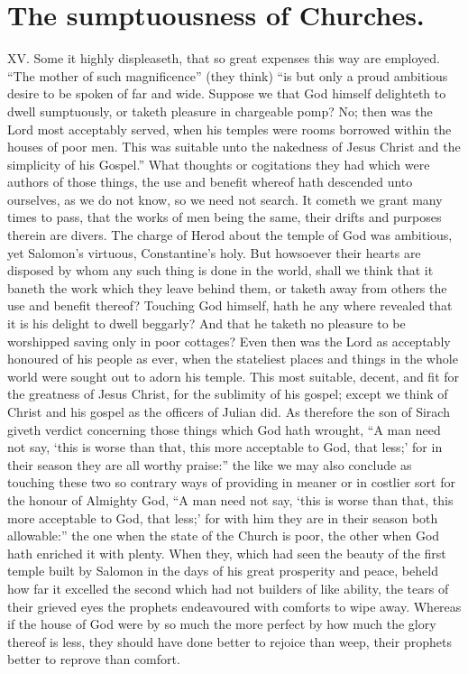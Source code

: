 \section*{The sumptuousness of Churches.}
XV. Some it highly displeaseth, that so great expenses this way are employed. “The mother of such magnificence” (they think) “is but only a proud ambitious desire to be spoken of far and wide. Suppose we that God himself delighteth to dwell sumptuously, or taketh pleasure in  chargeable pomp? No; then was the Lord most acceptably served, when his temples were rooms borrowed within the houses of poor men. This was suitable unto the nakedness of Jesus Christ and the simplicity of his Gospel.”
What thoughts or cogitations they had which were authors of those things, the use and benefit whereof hath descended unto ourselves, as we do not know, so we need not search. It cometh we grant many times to pass, that the works of men being the same, their drifts and purposes therein are divers. The charge of Herod about the temple of God was ambitious, yet Salomon’s virtuous, Constantine’s holy. But howsoever their hearts are disposed by whom any such thing is done in the world, shall we think that it baneth the work which they leave behind them, or taketh away from others the use and benefit thereof?
Touching God himself, hath he any where revealed that it is his delight to dwell beggarly? And that he taketh no pleasure to be worshipped saving only in poor cottages? Even then was the Lord as acceptably honoured of his people as ever, when the stateliest places and things in the whole world were sought out to adorn his temple. This most suitable, decent, and fit for the greatness of Jesus Christ, for the sublimity of his gospel; except we think of Christ and his gospel as the officers of Julian did. As therefore the son of Sirach giveth verdict concerning those things which God hath wrought, “A man need not say, ‘this is worse than that, this more acceptable to God, that less;’ for in their season they are all worthy praise:” the like we may also conclude as touching these two so contrary ways of providing in meaner or in costlier sort for the honour of Almighty God, “A man need not say, ‘this is worse than that, this more acceptable to God, that less;’ for with him they are in their season both allowable:” the one when the state of the Church is poor, the other when God hath enriched it with plenty.
When they, which had seen the beauty of the first temple  built by Salomon in the days of his great prosperity and peace, beheld how far it excelled the second which had not builders of like ability, the tears of their grieved eyes the prophets endeavoured with comforts to wipe away. Whereas if the house of God were by so much the more perfect by how much the glory thereof is less, they should have done better to rejoice than weep, their prophets better to reprove than comfort.
